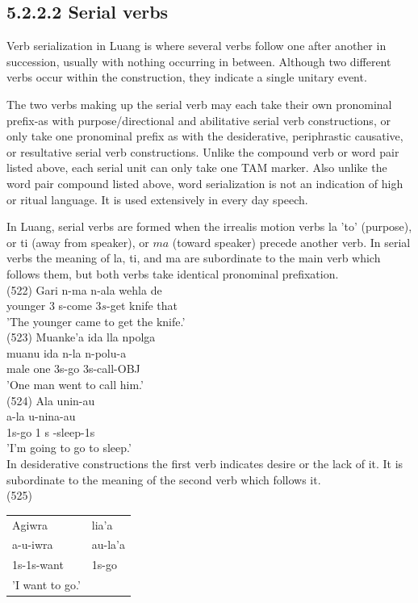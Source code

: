 \documentclass[10pt]{article}
\begin{document}
\subsection*{5.2.2.2 Serial verbs}
Verb serialization in Luang is where several verbs follow one after another in succession, usually with nothing occurring in between. Although two different verbs occur within the construction, they indicate a single unitary event.

The two verbs making up the serial verb may each take their own pronominal prefix-as with purpose/directional and abilitative serial verb constructions, or only take one pronominal prefix as with the desiderative, periphrastic causative, or resultative serial verb constructions. Unlike the compound verb or word pair listed above, each serial unit can only take one TAM marker. Also unlike the word pair compound listed above, word serialization is not an indication of high or ritual language. It is used extensively in every day speech.

In Luang, serial verbs are formed when the irrealis motion verbs la 'to' (purpose), or ti (away from speaker), or \(m a\) (toward speaker) precede another verb. In serial verbs the meaning of la, ti, and ma are subordinate to the main verb which follows them, but both verbs take identical pronominal prefixation.\\
(522) Gari n-ma n-ala wehla de\\
younger 3 s-come \(3 s\)-get knife that\\
'The younger came to get the knife.'\\
(523) Muanke'a ida lla npolga\\
muanu ida n-la n-polu-a\\
male one 3s-go 3s-call-OBJ\\
'One man went to call him.'\\
(524) Ala unin-au\\
a-la u-nina-au\\
1s-go 1 s -sleep-1s\\
'I'm going to go to sleep.'\\
In desiderative constructions the first verb indicates desire or the lack of it. It is subordinate to the meaning of the second verb which follows it.\\
(525)

\begin{center}
\begin{tabular}{ll}
Agiwra & lia'a \\
a-u-iwra & au-la'a \\
1s-1s-want & 1s-go \\
'I want to go.' &  \\
\end{tabular}
\end{center}
\end{document}
